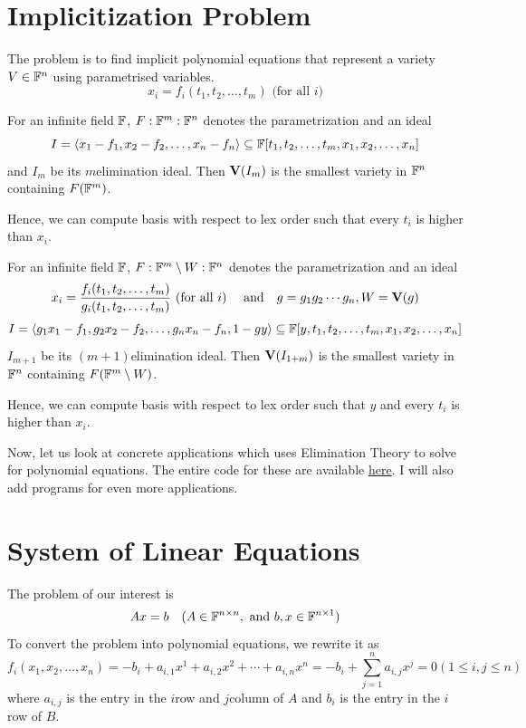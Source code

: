 \documentclass[a4paper,11pt]{article}
\begin{document}
\section{Implicitization Problem}
The problem is to find implicit polynomial equations that represent a variety $V\in\mathbb{F}^n$ using parametrised variables. 
\begin{equation}
    x_i= f_i(t_1,t_2,\ldots,t_m) \text{ (for all $i$)}
\end{equation}
\begin{theorem}
    For an infinite field $\mathbb{F}$, $F:\mathbb{F}^m:\mathbb{F}^n$ denotes the parametrization and an ideal
    \begin{equation}
         I=\langle x_1-f_1,x_2-f_2, \ldots, x_n-f_n\rangle\subseteq\mathbb{F}[t_1,t_2,\ldots,t_m, x_1, x_2, \ldots, x_n]
     \end{equation} and $I_m$ be its $m$\suth elimination ideal. Then $\textbf{V}(I_m)$ is the smallest variety in $\mathbb{F}^n$ containing $F(\mathbb{F}^m)$.
\end{theorem}
Hence, we can compute \Grob basis with respect to lex order such that every $t_i$ is higher than $x_i$.
\begin{theorem}
    For an infinite field $\mathbb{F}$, $F:\mathbb{F}^m\setminus W:\mathbb{F}^n$ denotes the parametrization and an ideal
    \begin{equation}
        x_i= \dfrac{f_i(t_1,t_2,\ldots,t_m)}{g_i(t_1,t_2,\ldots,t_m)} \text{ (for all $i$)} \text{ \quad and\quad } g=g_1g_2\cdots g_n,W=\textbf{V}(g)
    \end{equation}
    \begin{equation}
        I=\langle g_1x_1-f_1,g_2x_2-f_2, \ldots, g_nx_n-f_n, 1-gy\rangle\subseteq\mathbb{F}[y,t_1,t_2,\ldots,t_m, x_1, x_2, \ldots, x_n]
    \end{equation}
    $I_{m+1}$ be its $(m+1)$\suth elimination ideal. Then $\textbf{V}(I_{1+m})$ is the smallest variety in $\mathbb{F}^n$ containing $F(\mathbb{F}^m\setminus W)$.
\end{theorem}
Hence, we can compute \Grob basis with respect to lex order such that $y$ and every $t_i$ is higher than $x_i$.

Now, let us look at concrete applications which uses Elimination Theory to solve for polynomial equations. The entire code for these are available \href{https://github.com/paramrathour/Groebner-Basis-Applications}{here}. I will also add programs for even more applications.
\section{System of Linear Equations}
The problem of our interest is 
\begin{equation}
    Ax=b \quad(A\in \mathbb{F}^{n\times n}, \text{ and } b,x\in\mathbb{F}^{n\times 1})
\end{equation}
To convert the problem into polynomial equations, we rewrite it as
\begin{equation}
    f_i(x_1, x_2, \ldots, x_n) = -b_i + a_{i,1}x^1 + a_{i,2}x^2 + \cdots + a_{i,n}x^n = -b_i + \sum_{j=1}^n a_{i,j}x^j = 0 (1\leq i,j\leq n)
\end{equation}
where $a_{i,j}$ is the entry in the $i$\suth row and $j$\suth column of $A$ and $b_i$ is the entry in the $i$\suth row of $B$.
\end{document}

